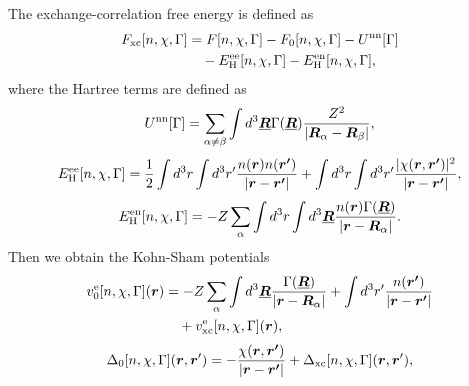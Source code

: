 The exchange-correlation free energy is defined as
%
\begin{equation}%
\begin{split}
	\label{eq:Fxc-def}
	F_{\mathrm {xc}}[n, \chi, \Gamma] &= F[n, \chi, \Gamma] - F_0[n, \chi, \Gamma] - U^{\rm nn}[\Gamma] \\
							&\quad - E^{\rm ee}_{\rm H}[n, \chi, \Gamma] - E^{\rm en}_{\rm H}[n, \chi, \Gamma],
\end{split}
\end{equation}
%
where the Hartree terms are defined as
%
\begin{equation}%
	U^{\rm nn}[\Gamma] = \sum_{\alpha \neq \beta}\int d^3\underline{\bm{R}}\Gamma({\underline{\bm{R}}})
						\frac{Z^2}{\left| \bm{R}_\alpha - \bm{R}_\beta \right|},
\end{equation}
%
\begin{equation}%
	\label{eq:anomHartree}
	E^{\rm ee}_{\rm H}[n, \chi, \Gamma] = \frac{1}{2}\int d^3r\int d^3r' \frac{n(\bm{r})n(\bm{r'})}{|\bm{r}-\bm{r'}|}
								+ \int d^3r\int d^3r' \frac{|\chi(\bm{r}, \bm{r'})|^2}{|\bm{r}-\bm{r'}|},
\end{equation}
%
\begin{equation}%
	E^{\rm en}_{\rm H}[n, \chi, \Gamma] = -Z\sum_{\alpha} \int d^3r \int d^3\underline{\bm{R}} 
								\frac{n(\bm{r})\Gamma(\underline{\bm{R}})}{|\bm{r}-\bm{R}_\alpha|}.
\end{equation}
%
Then we obtain the Kohn-Sham potentials 
%
\begin{equation} %
\begin{split}
	v^{\rm e}_0[n, \chi, \Gamma]({\bm r}) &= -Z\sum_{\alpha} \int d^3 \underline{\bm{R}}
									\frac{\Gamma(\underline{\bm{R}})}{|\bm{r}-\bm{R}_\alpha |} 
				+ \int d^3 r' \frac{n(\bm{r'})}{|\bm{r}-\bm{r'}|} \\
				& \quad + v^{\rm e}_{\rm xc}[n, \chi, \Gamma]({\bm r}),
\end{split}
\end{equation}
%
\begin{equation} %
\label{eq:Delta0}
\begin{split}
	\Delta_0[n, \chi, \Gamma]({\bm r}, {\bm r'}) = -\frac{\chi(\bm{r}, \bm{r'})}{|\bm{r}-\bm{r'}|}
									 + \Delta_{\rm xc}[n, \chi, \Gamma]({\bm r}, {\bm r'}),
\end{split}
\end{equation}
